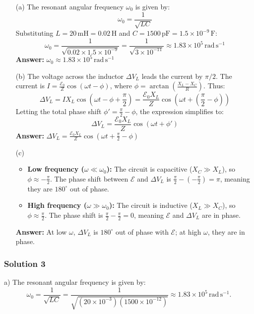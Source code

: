 \documentclass{article}
\begin{document}
\begin{enumerate}
    \item[(a)] The resonant angular frequency \(\omega_0\) is given by:
    \[
    \omega_0 = \frac{1}{\sqrt{LC}}
    \]
    Substituting \(L = 20\,\mathrm{mH} = 0.02\,\mathrm{H}\) and \(C = 1500\,\mathrm{pF} = 1.5 \times 10^{-9}\,\mathrm{F}\):
    \[
    \omega_0 = \frac{1}{\sqrt{0.02 \times 1.5 \times 10^{-9}}} = \frac{1}{\sqrt{3 \times 10^{-11}}} \approx 1.83 \times 10^5\,\mathrm{rad\,s^{-1}}
    \]
    \textbf{Answer:} \(\boxed{\omega_0 \approx 1.83 \times 10^5\,\mathrm{rad\,s^{-1}}}\)

    \item[(b)] The voltage across the inductor \(\Delta V_L\) leads the current by \(\pi/2\). The current is \(I = \frac{\mathcal{E}_0}{Z} \cos(\omega t - \phi)\), where \(\phi = \arctan\left(\frac{X_L - X_C}{R}\right)\). Thus:
    \[
    \Delta V_L = I X_L \cos\left(\omega t - \phi + \frac{\pi}{2}\right) = \frac{\mathcal{E}_0 X_L}{Z} \cos\left(\omega t + \left(\frac{\pi}{2} - \phi\right)\right)
    \]
    Letting the total phase shift \(\phi' = \frac{\pi}{2} - \phi\), the expression simplifies to:
    \[
    \Delta V_L = \frac{\mathcal{E}_0 X_L}{Z} \cos\left(\omega t + \phi'\right)
    \]
    \textbf{Answer:} \(\boxed{\Delta V_L = \frac{\mathcal{E}_0 X_L}{Z} \cos\left(\omega t + \frac{\pi}{2} - \phi\right)}\)

    \item[(c)] 
    \begin{itemize}
        \item \textbf{Low frequency (\(\omega \ll \omega_0\)):} The circuit is capacitive (\(X_C \gg X_L\)), so \(\phi \approx -\frac{\pi}{2}\). The phase shift between \(\mathcal{E}\) and \(\Delta V_L\) is \(\frac{\pi}{2} - (-\frac{\pi}{2}) = \pi\), meaning they are \(180^\circ\) out of phase.
        \item \textbf{High frequency (\(\omega \gg \omega_0\)):} The circuit is inductive (\(X_L \gg X_C\)), so \(\phi \approx \frac{\pi}{2}\). The phase shift is \(\frac{\pi}{2} - \frac{\pi}{2} = 0\), meaning \(\mathcal{E}\) and \(\Delta V_L\) are in phase.
    \end{itemize}
    \textbf{Answer:} At low \(\omega\), \(\Delta V_L\) is \(180^\circ\) out of phase with \(\mathcal{E}\); at high \(\omega\), they are in phase.
\end{enumerate}


\subsubsection{Solution 3}
a) The resonant angular frequency is given by:
\[
\omega_0 = \frac{1}{\sqrt{LC}} = \frac{1}{\sqrt{(20 \times 10^{-3})(1500 \times 10^{-12})}} \approx 1.83 \times 10^5 \, \mathrm{rad\,s^{-1}}.
\]
\end{document}
